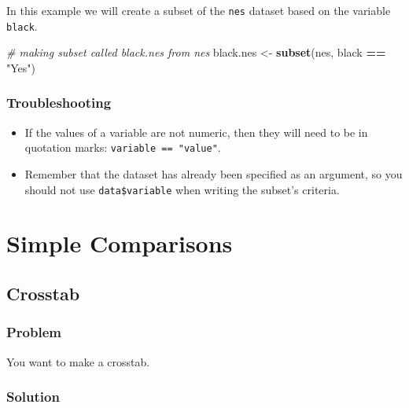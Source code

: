 \documentclass[
]{book}
\newenvironment{Shaded}{\begin{snugshade}}{\end{snugshade}}
\newcommand{\CommentTok}[1]{\textcolor[rgb]{0.56,0.35,0.01}{\textit{#1}}}
\newcommand{\FunctionTok}[1]{\textcolor[rgb]{0.13,0.29,0.53}{\textbf{#1}}}
\newcommand{\NormalTok}[1]{#1}
\newcommand{\OtherTok}[1]{\textcolor[rgb]{0.56,0.35,0.01}{#1}}
\newcommand{\SpecialCharTok}[1]{\textcolor[rgb]{0.81,0.36,0.00}{\textbf{#1}}}
\newcommand{\StringTok}[1]{\textcolor[rgb]{0.31,0.60,0.02}{#1}}
\begin{document}
In this example we will create a subset of the \texttt{nes} dataset based on the variable \texttt{black}.

\begin{Shaded}
\begin{Highlighting}[]
\CommentTok{\# making subset called \textquotesingle{}black.nes\textquotesingle{} from \textquotesingle{}nes\textquotesingle{}}
\NormalTok{black.nes }\OtherTok{\textless{}{-}} \FunctionTok{subset}\NormalTok{(nes, black }\SpecialCharTok{==} \StringTok{"Yes"}\NormalTok{)}
\end{Highlighting}
\end{Shaded}

\hypertarget{troubleshooting-25}{%
\subsection{Troubleshooting}\label{troubleshooting-25}}

\begin{itemize}
\item
  If the values of a variable are not numeric, then they will need to be in quotation marks: \texttt{variable\ ==\ "value"}.
\item
  Remember that the dataset has already been specified as an argument, so you should not use \texttt{data\$variable} when writing the subset's criteria.
\end{itemize}

\hypertarget{simple-comparisons}{%
\chapter{Simple Comparisons}\label{simple-comparisons}}

\hypertarget{crosstab}{%
\section{Crosstab}\label{crosstab}}

\hypertarget{problem-29}{%
\subsection{Problem}\label{problem-29}}

You want to make a crosstab.

\hypertarget{solution-28}{%
\subsection{Solution}\label{solution-28}}
\end{document}
